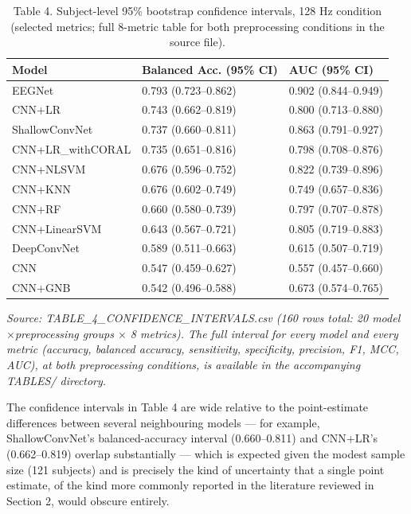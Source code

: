 \documentclass[a4paper,fleqn]{cas-sc}
\begin{document}
\begin{table}[htbp]
\centering
\small
\caption{Table 4. Subject-level 95\% bootstrap confidence intervals, 128 Hz condition (selected metrics; full 8-metric table for both preprocessing conditions in the source file).}
\begin{tabular}{lll}
\toprule
Model & Balanced Acc. (95\% CI) & AUC (95\% CI) \\
\midrule
EEGNet & 0.793 (0.723--0.862) & 0.902 (0.844--0.949) \\
CNN+LR & 0.743 (0.662--0.819) & 0.800 (0.713--0.880) \\
ShallowConvNet & 0.737 (0.660--0.811) & 0.863 (0.791--0.927) \\
CNN+LR\_withCORAL & 0.735 (0.651--0.816) & 0.798 (0.708--0.876) \\
CNN+NLSVM & 0.676 (0.596--0.752) & 0.822 (0.739--0.896) \\
CNN+KNN & 0.676 (0.602--0.749) & 0.749 (0.657--0.836) \\
CNN+RF & 0.660 (0.580--0.739) & 0.797 (0.707--0.878) \\
CNN+LinearSVM & 0.643 (0.567--0.721) & 0.805 (0.719--0.883) \\
DeepConvNet & 0.589 (0.511--0.663) & 0.615 (0.507--0.719) \\
CNN & 0.547 (0.459--0.627) & 0.557 (0.457--0.660) \\
CNN+GNB & 0.542 (0.496--0.588) & 0.673 (0.574--0.765) \\
\bottomrule
\end{tabular}
\end{table}

\textit{Source: TABLE\_4\_CONFIDENCE\_INTERVALS.csv (160 rows total: 20 model$\times$preprocessing groups $\times$ 8 metrics). The full interval for every model and every metric (accuracy, balanced accuracy, sensitivity, specificity, precision, F1, MCC, AUC), at both preprocessing conditions, is available in the accompanying TABLES/ directory.}



The confidence intervals in Table 4 are wide relative to the point-estimate differences between several neighbouring models --- for example, ShallowConvNet's balanced-accuracy interval (0.660--0.811) and CNN+LR's (0.662--0.819) overlap substantially --- which is expected given the modest sample size (121 subjects) and is precisely the kind of uncertainty that a single point estimate, of the kind more commonly reported in the literature reviewed in Section 2, would obscure entirely.
\end{document}
